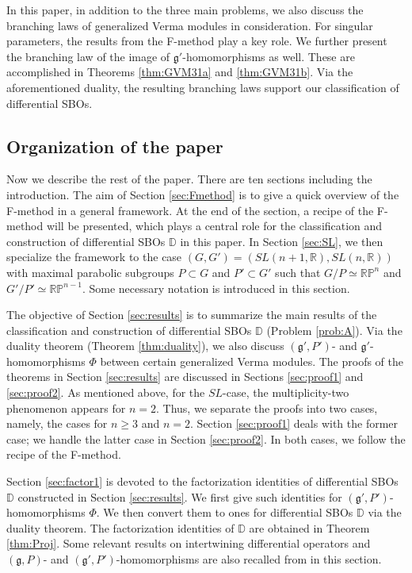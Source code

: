 \documentclass[reqno,11pt]{amsart}
\theoremstyle{remark}
\theoremstyle{definition}
\numberwithin{equation}{section}
\newcommand{\fg}{{\mathfrak g}}
\newcommand{\R}{\mathbb{R}}
\newcommand{\RP}{\mathbb{R}\mathbb{P}}
\newcommand{\bD}{\mathbb{D}}
\begin{document}
In this paper, in addition to the three main problems,
we also discuss the branching laws of generalized Verma modules
in consideration. For singular parameters, the results from the F-method play a key role.
We further present the branching law of the image of $\fg'$-homomorphisms as well.
These are accomplished in Theorems \ref{thm:GVM31a} and \ref{thm:GVM31b}.
Via the aforementioned duality, the resulting branching laws support our classification of differential SBOs.

\subsection{Organization of the paper}

Now we describe the rest of the paper.
There are ten sections including the introduction.
The aim of Section \ref{sec:Fmethod} is to 
give a quick overview of the F-method in a general
framework. At the end of the section, a recipe of the F-method will be presented,
which plays a central role for the classification and construction of differential 
SBOs $\bD$ in this paper. 
In Section \ref{sec:SL}, we then specialize the framework to the case 
$(G,G')=(SL(n+1,\R), SL(n,\R))$ with maximal parabolic subgroups 
$P\subset G$ and $P'\subset G'$ such that $G/P\simeq \RP^n$ and 
$G'/P' \simeq \RP^{n-1}$. Some necessary notation is introduced in this section.

The objective of Section \ref{sec:results} is to summarize the main results
of the classification and construction of differential SBOs 
$\bD$ (Problem \ref{prob:A}). Via the duality theorem (Theorem \ref{thm:duality}),
we also discuss $(\fg',P')$- and $\fg'$-homomorphisms $\Phi$ between
certain generalized Verma modules. 
The proofs of the theorems in 
Section \ref{sec:results} are discussed in 
Sections \ref{sec:proof1} and \ref{sec:proof2}.  
As mentioned above, for the $SL$-case, 
the multiplicity-two phenomenon appears for $n=2$. Thus, we separate the proofs
into two cases, namely, the cases for $n\geq 3$ and $n=2$. Section \ref{sec:proof1}
deals with the former case; we handle the latter case in Section \ref{sec:proof2}.
In both cases, we follow the recipe of the F-method.

Section \ref{sec:factor1} is devoted to the factorization identities of 
differential SBOs $\bD$ constructed in Section \ref{sec:results}. 
We first give such identities for 
$(\fg',P')$-homomorphisms $\Phi$. We then convert them to ones for differential SBOs 
$\bD$ via the duality theorem. The factorization identities of $\bD$ are obtained in
Theorem \ref{thm:Proj}. 
Some relevant results on intertwining differential operators and 
$(\fg, P)$- and $(\fg', P')$-homomorphisms are also recalled from \cite{KuOr24} in this section.
\end{document}
